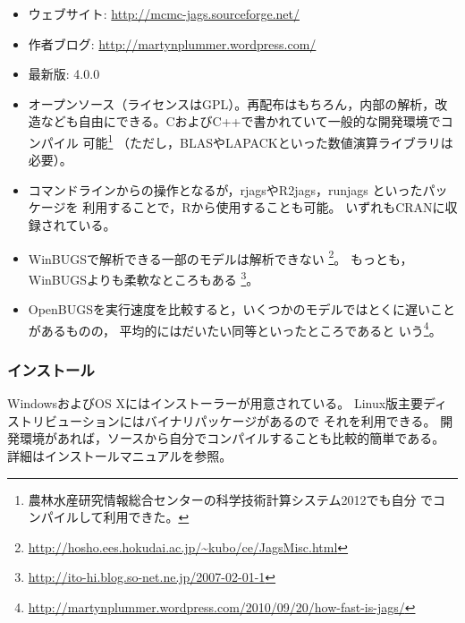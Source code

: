 \documentclass[11pt,uplatex]{jsarticle}
\begin{document}
\begin{itemize}

\item ウェブサイト:
  \url{http://mcmc-jags.sourceforge.net/}
  
\item 作者ブログ:
  \url{http://martynplummer.wordpress.com/}  

\item 最新版: 4.0.0

\item オープンソース（ライセンスはGPL）。再配布はもちろん，内部の解析，改
  造なども自由にできる。CおよびC++で書かれていて一般的な開発環境でコンパイル
  可能\footnote{農林水産研究情報総合センターの科学技術計算システム2012でも自分
  でコンパイルして利用できた。}
  （ただし，BLASやLAPACKといった数値演算ライブラリは必要）。

\item コマンドラインからの操作となるが，\textsf{rjags}や\textsf{R2jags}，\textsf{runjags}
といったパッケージを
利用することで，\textsf{R}から使用することも可能。
いずれもCRANに収録されている。

\item \textsf{WinBUGS}で解析できる一部のモデルは解析できない
  \footnote{\url{http://hosho.ees.hokudai.ac.jp/~kubo/ce/JagsMisc.html}}。
 もっとも，\textsf{WinBUGS}よりも柔軟なところもある
  \footnote{\url{http://ito-hi.blog.so-net.ne.jp/2007-02-01-1}}。
  
\item \textsf{OpenBUGS}を実行速度を比較すると，いくつかのモデルではとくに遅いことがあるものの，
平均的にはだいたい同等といったところであると
いう\footnote{\url{http://martynplummer.wordpress.com/2010/09/20/how-fast-is-jags/}}。

\end{itemize}

\subsubsection*{インストール}
WindowsおよびOS Xにはインストーラーが用意されている。
Linux版主要ディストリビューションにはバイナリパッケージがあるので
それを利用できる。
開発環境があれば，ソースから自分でコンパイルすることも比較的簡単である。
詳細はインストールマニュアルを参照。

\end{document}
